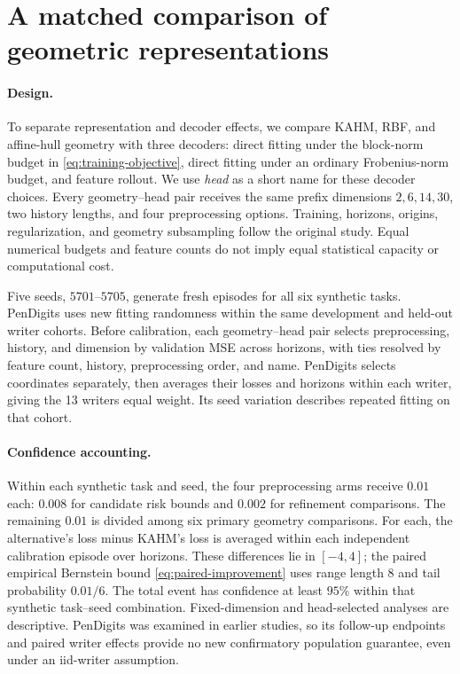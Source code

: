 \section{A matched comparison of geometric representations}
\label{sec:matched-geometry}


\paragraph{Design.}
To separate representation and decoder effects, we compare KAHM, RBF, and
affine-hull geometry with three decoders: direct fitting under the block-norm
budget in \eqref{eq:training-objective}, direct fitting under an ordinary
Frobenius-norm budget, and feature rollout. We use \emph{head} as a short name
for these decoder choices.
Every geometry--head pair receives the same prefix dimensions $2,6,14,30$,
two history lengths, and four preprocessing options. Training, horizons,
origins, regularization, and geometry subsampling follow the original study.
Equal numerical budgets and feature counts do not imply equal statistical
capacity or computational cost.

Five seeds, $5701$--$5705$, generate fresh episodes for all six synthetic
tasks. PenDigits uses new fitting randomness within the same development and
held-out writer cohorts. Before calibration, each geometry--head pair selects
preprocessing, history, and dimension by validation MSE across horizons, with
ties resolved by feature count, history, preprocessing order, and name.
PenDigits selects coordinates separately, then averages their losses and
horizons within each writer, giving the 13 writers equal weight. Its seed
variation describes repeated fitting on that cohort.

\paragraph{Confidence accounting.}
Within each synthetic task and seed, the four preprocessing arms receive
$0.01$ each: $0.008$ for candidate risk bounds and $0.002$ for refinement
comparisons. The remaining $0.01$ is divided among six primary geometry
comparisons. For each, the alternative's loss minus KAHM's loss is averaged
within each independent calibration episode over horizons. These differences
lie in $[-4,4]$; the paired empirical Bernstein bound
\eqref{eq:paired-improvement} uses range length $8$ and tail probability
$0.01/6$. The total event has confidence at least $95\%$ within that
synthetic task--seed combination. Fixed-dimension and head-selected analyses
are descriptive. PenDigits was examined in earlier studies, so its follow-up
endpoints and paired writer effects provide no new confirmatory population
guarantee, even under an iid-writer assumption.


